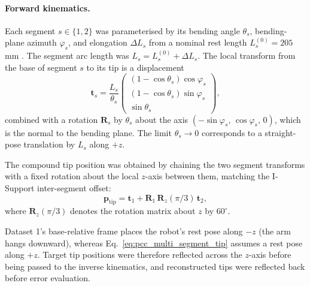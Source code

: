\paragraph{Forward kinematics.}
Each segment $s \in \{1, 2\}$ was parameterised by its bending angle $\theta_s$, bending-plane azimuth $\varphi_s$, and elongation $\Delta L_s$ from a nominal rest length $L_s^{(0)} = 205$\,mm \cite{manti2016soft}. The segment arc length was $L_s = L_s^{(0)} + \Delta L_s$. The local transform from the base of segment $s$ to its tip is a displacement
\begin{equation}
  \mathbf{t}_s = \frac{L_s}{\theta_s} \begin{pmatrix} (1 - \cos\theta_s) \cos\varphi_s \\ (1 - \cos\theta_s) \sin\varphi_s \\ \sin\theta_s \end{pmatrix},
  \label{eq:pcc_multi_segment_tip}
\end{equation}
combined with a rotation $\mathbf{R}_s$ by $\theta_s$ about the axis $(-\sin\varphi_s,\, \cos\varphi_s,\, 0)$, which is the normal to the bending plane. The limit $\theta_s \to 0$ corresponds to a straight-pose translation by $L_s$ along $+z$.

The compound tip position was obtained by chaining the two segment transforms with a fixed rotation about the local $z$-axis between them, matching the I-Support inter-segment offset:
\begin{equation}
  \mathbf{p}_{\mathrm{tip}} = \mathbf{t}_1 + \mathbf{R}_1 \, \mathbf{R}_z(\pi/3) \, \mathbf{t}_2, \label{eq:pcc_multi_fk}
\end{equation}
where $\mathbf{R}_z(\pi/3)$ denotes the rotation matrix about $z$ by $60^{\circ}$.

Dataset 1's base-relative frame places the robot's rest pose along $-z$ (the arm hangs downward), whereas Eq.~\eqref{eq:pcc_multi_segment_tip} assumes a rest pose along $+z$. Target tip positions were therefore reflected across the $z$-axis before being passed to the inverse kinematics, and reconstructed tips were reflected back before error evaluation.

